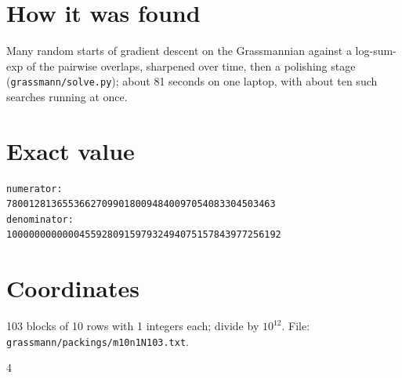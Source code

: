 \documentclass[11pt,a4paper]{article}
\begin{document}
\section{How it was found}
Many random starts of gradient descent on the Grassmannian against a log-sum-exp of the pairwise overlaps, sharpened over time, then a polishing stage (\texttt{grassmann/solve.py}); about 81 seconds on one laptop, with about ten such searches running at once.


\appendix
\section{Exact value}
{\small
\begin{verbatim}
numerator:
780012813655366270990180094840097054083304503463
denominator:
1000000000000455928091597932494075157843977256192
\end{verbatim}}

\section{Coordinates}
103 blocks of 10 rows with 1 integers each; divide by $10^{12}$. File: \texttt{grassmann/packings/m10n1N103.txt}.
{\tiny
\begin{multicols}{4}
\end{multicols}}
\end{document}
